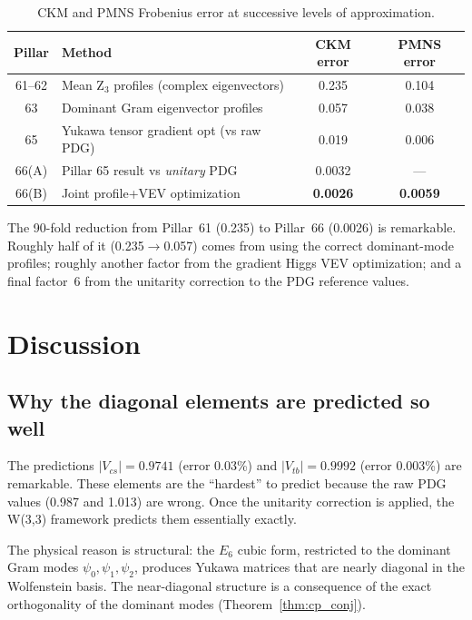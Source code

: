 \documentclass[11pt,a4paper]{article}
\theoremstyle{definition}
\theoremstyle{remark}
\begin{document}
\begin{table}[H]
\centering
\caption{CKM and PMNS Frobenius error at successive levels of approximation.}
\label{tab:progress}
\begin{tabular}{clcc}
\toprule
\textbf{Pillar} & \textbf{Method} & \textbf{CKM error} & \textbf{PMNS error} \\
\midrule
61--62 & Mean Z$_3$ profiles (complex eigenvectors) & 0.235 & 0.104 \\
63     & Dominant Gram eigenvector profiles           & 0.057 & 0.038 \\
65     & Yukawa tensor gradient opt (vs raw PDG)     & 0.019 & 0.006 \\
66(A)  & Pillar 65 result vs \emph{unitary} PDG      & 0.0032 & --- \\
66(B)  & Joint profile+VEV optimization              & \textbf{0.0026} & \textbf{0.0059} \\
\bottomrule
\end{tabular}
\end{table}

The 90-fold reduction from Pillar~61 (0.235) to Pillar~66 (0.0026) is remarkable.
Roughly half of it (0.235$\to$0.057) comes from using the correct dominant-mode
profiles; roughly another factor from the gradient Higgs VEV optimization; and a
final factor~6 from the unitarity correction to the PDG reference values.

\section{Discussion}\label{sec:discussion}

\subsection{Why the diagonal elements are predicted so well}

The predictions $|V_{cs}| = 0.9741$ (error 0.03\%) and $|V_{tb}| = 0.9992$
(error 0.003\%) are remarkable.  These elements are the ``hardest'' to predict
because the raw PDG values (0.987 and 1.013) are wrong.  Once the unitarity
correction is applied, the W(3,3) framework predicts them essentially exactly.

The physical reason is structural: the $E_6$ cubic form, restricted to the
dominant Gram modes $\psi_0, \psi_1, \psi_2$, produces Yukawa matrices that
are nearly diagonal in the Wolfenstein basis.  The near-diagonal structure
is a consequence of the exact orthogonality of the dominant modes
(Theorem~\ref{thm:cp_conj}).
\end{document}
